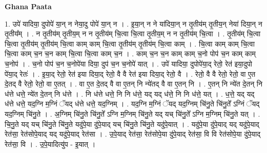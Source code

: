 \documentclass[17pt]{extarticle}
\begin{document}
\textbf{Ghana Paata } \newline

1. उपे॑ यादिया॒ दुपोपे॑ या॒न् न नेया॒दु पोपे॑ या॒न् न । . इ॒या॒न् न ने या॑दिया॒न् न तृ॒तीय॑म् तृ॒तीय॒न् नेया॑ दिया॒न् न तृ॒तीय᳚म् । . न तृ॒तीय॑म् तृ॒तीय॒म् न न तृ॒तीय॑म् चि॒त्वा चि॒त्वा तृ॒तीय॒म् न न तृ॒तीय॑म् चि॒त्वा । . तृ॒तीय॑म् चि॒त्वा चि॒त्वा तृ॒तीय॑म् तृ॒तीय॑म् चि॒त्वा काम् काम् चि॒त्वा तृ॒तीय॑म् तृ॒तीय॑म् चि॒त्वा काम् । . चि॒त्वा काम् काम् चि॒त्वा चि॒त्वा काम् च॒न च॒न काम् चि॒त्वा चि॒त्वा काम् च॒न । . काम् च॒न च॒न काम् काम् च॒नो पोप॑ च॒न काम् काम् च॒नोप॑ । . च॒नो पोप॑ च॒न च॒नोपे॑या दिया॒ दुप॑ च॒न च॒नोपे॑ यात् । . उपे॑ यादिया॒ दुपोपे॑या॒द् रेतो॒ रेत॑ इया॒दुपो पे॑या॒द् रेतः॑ । . इ॒या॒द् रेतो॒ रेत॑ इया दिया॒द् रेतो॒ वै वै रेत॑ इया दिया॒द् रेतो॒ वै । . रेतो॒ वै वै रेतो॒ रेतो॒ वा ए॒त दे॒तद् वै रेतो॒ रेतो॒ वा ए॒तत् । . वा ए॒त दे॒तद् वै वा ए॒तन् नि न्ये॑तद् वै वा ए॒तन् नि । . ए॒तन् नि न्ये॑त दे॒तन् नि ध॑त्ते धत्ते॒ न्ये॑त दे॒तन् नि ध॑त्ते । . नि ध॑त्ते धत्ते॒ नि नि ध॑त्ते॒ यद् यद् ध॑त्ते॒ नि नि ध॑त्ते॒ यत् । . ध॒त्ते॒ यद् यद् ध॑त्ते धत्ते॒ यद॒ग्नि म॒ग्निं ॅयद् ध॑त्ते धत्ते॒ यद॒ग्निम् । . यद॒ग्नि म॒ग्निं ॅयद् यद॒ग्निम् चि॑नु॒ते चि॑नु॒ते᳚ ऽग्निं ॅयद् यद॒ग्निम् चि॑नु॒ते । . अ॒ग्निम् चि॑नु॒ते चि॑नु॒ते᳚ ऽग्नि म॒ग्निम् चि॑नु॒ते यद् यच् चि॑नु॒ते᳚ ऽग्नि म॒ग्निम् चि॑नु॒ते यत् । . चि॒नु॒ते यद् यच् चि॑नु॒ते चि॑नु॒ते यदु॑पे॒या दु॑पे॒याद् यच् चि॑नु॒ते चि॑नु॒ते यदु॑पे॒यात् । . यदु॑पे॒या दु॑पे॒याद् यद् यदु॑पे॒याद् रेत॑सा॒ रेत॑सोपे॒याद् यद् यदु॑पे॒याद् रेत॑सा । . उ॒पे॒याद् रेत॑सा॒ रेत॑सोपे॒या दु॑पे॒याद् रेत॑सा॒ वि वि रेत॑सोपे॒या दु॑पे॒याद् रेत॑सा॒ वि । . उ॒पे॒यादित्यु॑प - इ॒यात् । \newline
\end{document}
